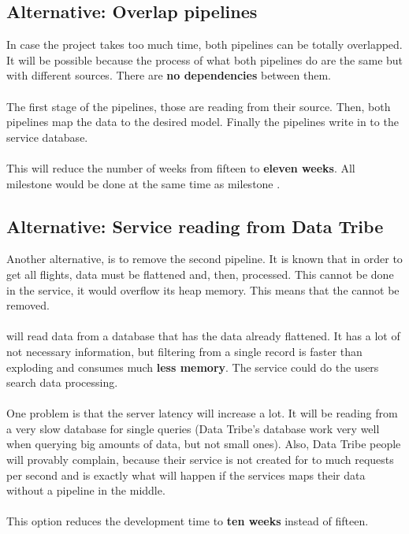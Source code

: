 \subsection{Alternative: Overlap pipelines}

In case the project takes too much time, both pipelines can be totally overlapped. It will be possible because the process of what both pipelines do are the same but with different sources. There are \textbf{no dependencies} between them.
\\\\
The first stage of the pipelines, those are reading from their source. Then, both pipelines map the data to the desired model. Finally the pipelines write in to the service database.
\\\\
This will reduce the number of weeks from fifteen to \textbf{eleven weeks}. All milestone  would be done at the same time as milestone .

\subsection{Alternative: Service reading from Data Tribe}

Another alternative, is to remove the second pipeline. It is known that in order to get all flights, data must be flattened and, then, processed. This cannot be done in the service, it would overflow its heap memory. This means that the  cannot be removed.
\\\\
 will read data from a database that has the data already flattened. It has a lot of not necessary information, but filtering from a single record is faster than exploding and consumes much \textbf{less memory}. The service could do the users search data processing.
\\\\
One problem is that the server latency will increase a lot. It will be reading from a very slow database for single queries (Data Tribe's database work very well when querying big amounts of data, but not small ones). Also, Data Tribe people will provably complain, because their service is not created for to much requests per second and is exactly what will happen if the services maps their data without a pipeline in the middle.
\\\\
This option reduces the development time to \textbf{ten weeks} instead of fifteen.

